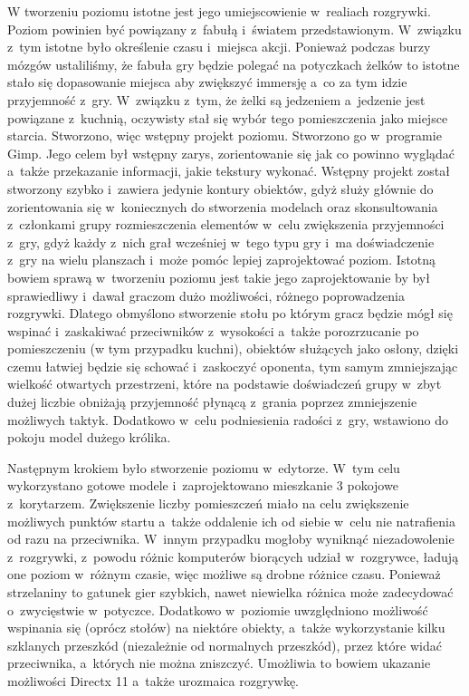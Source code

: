 W tworzeniu poziomu istotne jest jego umiejscowienie w~realiach rozgrywki. Poziom powinien być powiązany z~fabułą i~światem przedstawionym. W~związku z~tym istotne było określenie czasu i~miejsca akcji. Ponieważ podczas burzy mózgów ustaliliśmy, że fabuła gry będzie polegać na potyczkach żelków to istotne stało się dopasowanie miejsca aby zwiększyć immersję a~co za tym idzie przyjemność z~gry. W~związku z~tym, że żelki są jedzeniem a~jedzenie jest powiązane z~kuchnią, oczywisty stał się wybór tego pomieszczenia jako miejsce starcia. Stworzono, więc wstępny projekt poziomu. Stworzono go w~programie Gimp. Jego celem był wstępny zarys, zorientowanie się jak co powinno wyglądać a~także przekazanie informacji, jakie tekstury wykonać. Wstępny projekt został stworzony szybko i~zawiera jedynie kontury obiektów, gdyż służy głównie do zorientowania się w~koniecznych do stworzenia modelach oraz skonsultowania z~członkami grupy rozmieszczenia elementów w~celu zwiększenia przyjemności z~gry, gdyż każdy z~nich grał wcześniej w~tego typu gry i~ma doświadczenie z~gry na wielu planszach i~może pomóc lepiej zaprojektować poziom. Istotną bowiem sprawą w~tworzeniu poziomu jest takie jego zaprojektowanie by był sprawiedliwy i~dawał graczom dużo możliwości, różnego poprowadzenia rozgrywki. Dlatego obmyślono stworzenie stołu po którym gracz będzie mógł się wspinać i~zaskakiwać przeciwników z~wysokości a~także porozrzucanie po pomieszczeniu (w tym przypadku kuchni), obiektów służących jako osłony, dzięki czemu łatwiej będzie się schować i~zaskoczyć oponenta, tym samym zmniejszając wielkość otwartych przestrzeni, które na podstawie doświadczeń grupy w~zbyt dużej liczbie obniżają przyjemność płynącą z~grania poprzez zmniejszenie możliwych taktyk. Dodatkowo w~celu podniesienia radości z~gry, wstawiono do pokoju model dużego królika.

Następnym krokiem było stworzenie poziomu w~edytorze. W~tym celu wykorzystano gotowe modele i~zaprojektowano mieszkanie 3 pokojowe z~korytarzem. Zwiększenie liczby pomieszczeń miało na celu zwiększenie możliwych punktów startu a~także oddalenie ich od siebie w~celu nie natrafienia od razu na przeciwnika. W~innym przypadku mogłoby wyniknąć niezadowolenie z~rozgrywki, z~powodu różnic komputerów biorących udział w~rozgrywce, ładują one poziom w~różnym czasie, więc możliwe są drobne różnice czasu. Ponieważ strzelaniny to gatunek gier szybkich, nawet niewielka różnica może zadecydować o~zwycięstwie w~potyczce. Dodatkowo w~poziomie uwzględniono możliwość wspinania się (oprócz stołów) na niektóre obiekty, a~także wykorzystanie kilku szklanych przeszkód (niezależnie od normalnych przeszkód), przez które widać przeciwnika, a~których nie można zniszczyć. Umożliwia to bowiem ukazanie możliwości Directx 11 a~także urozmaica rozgrywkę.

